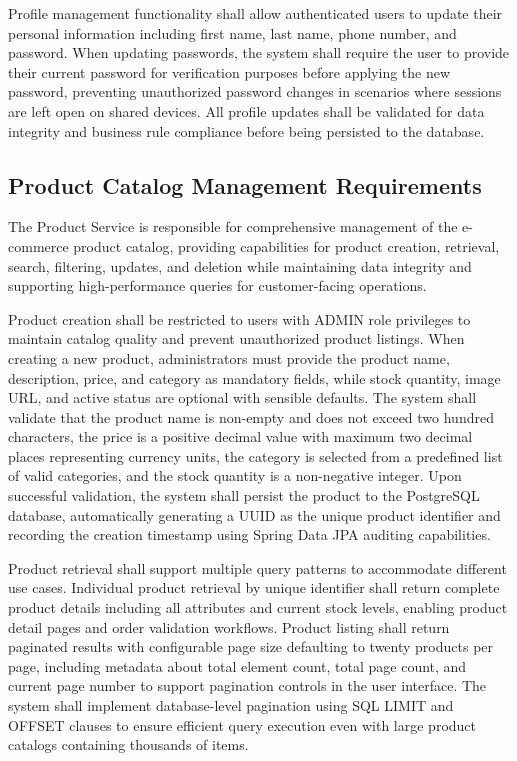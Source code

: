 Profile management functionality shall allow authenticated users to update their personal information including first name, last name, phone number, and password. When updating passwords, the system shall require the user to provide their current password for verification purposes before applying the new password, preventing unauthorized password changes in scenarios where sessions are left open on shared devices. All profile updates shall be validated for data integrity and business rule compliance before being persisted to the database.

\subsection{Product Catalog Management Requirements}

The Product Service is responsible for comprehensive management of the e-commerce product catalog, providing capabilities for product creation, retrieval, search, filtering, updates, and deletion while maintaining data integrity and supporting high-performance queries for customer-facing operations.

Product creation shall be restricted to users with ADMIN role privileges to maintain catalog quality and prevent unauthorized product listings. When creating a new product, administrators must provide the product name, description, price, and category as mandatory fields, while stock quantity, image URL, and active status are optional with sensible defaults. The system shall validate that the product name is non-empty and does not exceed two hundred characters, the price is a positive decimal value with maximum two decimal places representing currency units, the category is selected from a predefined list of valid categories, and the stock quantity is a non-negative integer. Upon successful validation, the system shall persist the product to the PostgreSQL database, automatically generating a UUID as the unique product identifier and recording the creation timestamp using Spring Data JPA auditing capabilities.

Product retrieval shall support multiple query patterns to accommodate different use cases. Individual product retrieval by unique identifier shall return complete product details including all attributes and current stock levels, enabling product detail pages and order validation workflows. Product listing shall return paginated results with configurable page size defaulting to twenty products per page, including metadata about total element count, total page count, and current page number to support pagination controls in the user interface. The system shall implement database-level pagination using SQL LIMIT and OFFSET clauses to ensure efficient query execution even with large product catalogs containing thousands of items.

